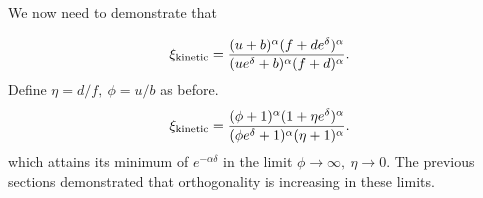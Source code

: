 We now need to demonstrate that 

\[
\xi_{\rm kinetic} =  \frac{(u+b)^\alpha(f+de^\delta)^\alpha}{(ue^\delta+b)^\alpha(f+d)^\alpha}.
\]
Define $\eta = d/f, \ \phi = u/b$ as before.
\[
\xi_{\rm kinetic} =  \frac{(\phi+1)^\alpha(1+\eta e^\delta)^\alpha}{(\phi e^\delta+1)^\alpha(\eta+1)^\alpha}.
\]
which attains its minimum of $e^{-\alpha\delta}$ in the limit $\phi \to \infty, \ \eta \to 0.$  
The previous sections demonstrated that orthogonality is increasing in these limits.

